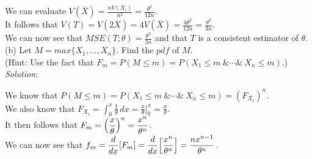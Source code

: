 \documentclass[12pt]{article}
\newcommand{\XB}{\color{black}}
\newcommand{\XV}{\color{violet}}
\begin{document}
\noindent 
We can evaluate $ \displaystyle V(\overline{X}) = \frac{nV(X_{i})}{n^2} = \frac{\theta^{2}}{12n} $. \\

\noindent 
It follows that $ \displaystyle V(T) = V(2\overline{X}) = 4V(\overline{X}) = \frac{4\theta^{2}}{12n} = \frac{\theta^{2}}{3n} $. \\

\noindent 
We can now see that $ \displaystyle MSE(T; \theta) = \frac{\theta^{2}}{3n} $ and that $ T $ is a consistent estimator of $ \theta $. \\



(b) Let $ M = max\{X_{1},...,X_{n}\} $. Find the $ pdf $ of $ M $. \\
(Hint: Use the fact that $ F_{m} = P(M \leq m) = P(X_{1} \leq m \ \& \cdots \& \ X_{n} \leq m) $.) 
\vspace{2.5mm} \\
\textit{Solution}:
\vspace{2.5mm}

\noindent 
We know that $ P(M \leq m) = P(X_{1} \leq m \ \& \cdots \& \ X_{n} \leq m) = (F_{X_{i}})^{n} $. \\

\noindent 
We also know that $ \displaystyle F_{X_{i}} = \int_{0}^{x} \frac{1}{\theta} \,dx = \frac{x}{\theta} \Big|_{0}^{x} = \frac{x}{\theta} $. \\

\noindent 
It then follows that $ \displaystyle F_{m} = \Bigl( \frac{x}{\theta} \Bigr)^{n} = \frac{x^{n}}{\theta^{n}} $. \\

\noindent 
We can now see that $ \displaystyle f_{m} = \frac{d}{dx}[F_{m}] = \frac{d}{dx} \Bigl[ \frac{x^{n}}{\theta^{n}} \Bigr] = \frac{nx^{n-1}}{\theta^{n}} $. \\

\end{document}
